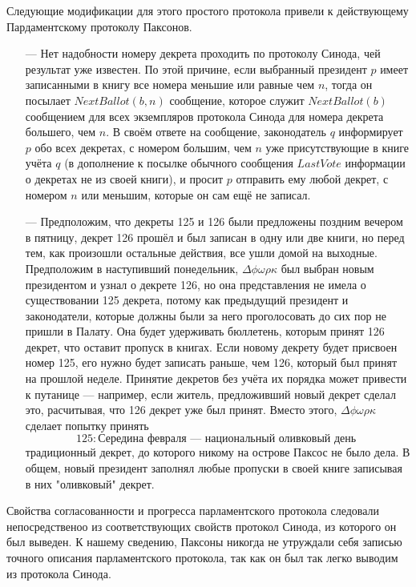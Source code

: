 \documentclass[12pt, a4paper]{article} %
\begin{document}
Следующие модификации для этого простого протокола привели к действующему Пардаментскому протоколу Паксонов.

\begin{itemize}
    \item[---] Нет надобности номеру декрета проходить по протоколу Синода, чей результат уже известен. По этой причине, если выбранный президент $p$ имеет записанными в книгу все номера меньшие или равные чем $n$, тогда он посылает $NextBallot(b,n)$ сообщение, которое служит $NextBallot(b)$ сообщением для всех экземпляров протокола Синода для номера декрета большего, чем $n$. В своём ответе на сообщение, законодатель $q$ информирует $p$ обо всех декретах, с номером большим, чем $n$ уже присутствующие в книге учёта $q$ (в дополнение к посылке обычного сообщения $LastVote$ информации о декретах не из своей книги), и просит $p$ отправить ему любой декрет, с номером $n$ или меньшим, которые он сам ещё не записал.

    \item[---] Предположим, что декреты 125 и 126 были предложены поздним вечером в пятницу, декрет 126 прошёл и был записан в одну или две книги, но перед тем, как произошли остальные действия, все ушли домой на выходные. Предположим в наступивший понедельник, $\Delta\phi\omega\rho\kappa$ был выбран новым президентом и узнал о декрете 126, но она представления не имела о существовании 125 декрета, потому как предыдущий президент и законодатели, которые должны были за него проголосовать до сих пор не пришли в Палату. Она будет удерживать бюллетень, которым принят 126 декрет, что оставит пропуск в книгах. Если новому декрету будет присвоен номер 125, его нужно будет записать раньше, чем 126, который был принят на прошлой неделе. Принятие декретов без учёта их порядка может привести к путанице --- например, если житель, предложивший новый декрет сделал это, расчитывая, что 126 декрет уже был принят. Вместо этого, $\Delta\phi\omega\rho\kappa$ сделает попытку принять 
\[
    125: \mbox{Середина февраля --- национальный оливковый день }
\]
традиционный декрет, до которого никому на острове Паксос не было дела. В общем, новый президент заполнял любые пропуски в своей книге записывая в них "оливковый" декрет.
\end{itemize}

Свойства согласованности и прогресса парламентского протокола следовали непосредственоо из соответствующих свойств протокол Синода, из которого он был выведен. К нашему сведению, Паксоны никогда не утруждали себя записью точного описания парламентского протокола, так как он был так легко выводим из протокола Синода.
\end{document}

